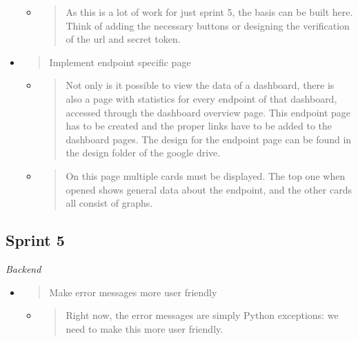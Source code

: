 \begin{itemize}
  \begin{itemize}
  \item
    \begin{quote}
    As this is a lot of work for just sprint 5, the basis can be built
    here. Think of adding the necessary buttons or designing the
    verification of the url and secret token.
    \end{quote}
  \end{itemize}
\item
  \begin{quote}
  Implement endpoint specific page
  \end{quote}

  \begin{itemize}
  \item
    \begin{quote}
    Not only is it possible to view the data of a dashboard, there is
    also a page with statistics for every endpoint of that dashboard,
    accessed through the dashboard overview page. This endpoint page has
    to be created and the proper links have to be added to the dashboard
    pages. The design for the endpoint page can be found in the design
    folder of the google drive.
    \end{quote}
  \item
    \begin{quote}
    On this page multiple cards must be displayed. The top one when
    opened shows general data about the endpoint, and the other cards
    all consist of graphs.
    \end{quote}
  \end{itemize}
\end{itemize}

\hypertarget{sprint-5}{%
\subsection{Sprint 5}\label{sprint-5}}

\emph{Backend}

\begin{itemize}
\item
  \begin{quote}
  Make error messages more user friendly
  \end{quote}

  \begin{itemize}
  \item
    \begin{quote}
    Right now, the error messages are simply Python exceptions: we need
    to make this more user friendly.
    \end{quote}
  \end{itemize}
\end{itemize}

